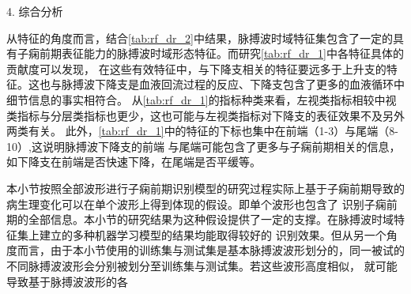 4. 综合分析

从特征的角度而言，结合\autoref{tab:rf_dr_2}中结果，脉搏波时域特征集包含了一定的具有子痫前期表征能力的脉搏波时域形态特征。而研究\autoref{tab:rf_dr_1}中各特征具体的贡献度可以发现，
在这些有效特征中，与下降支相关的特征要远多于上升支的特征。这也与脉搏波下降支是血液回流过程的反应、下降支包含了更多的血液循环中细节信息的事实相符合。
从\autoref{tab:rf_dr_1}的指标种类来看，左视类指标相较中视类指标与分层类指标也更少，这也可能与左视类指标对下降支的表征效果不及另外两类有关。
此外，\autoref{tab:rf_dr_1}中的特征的下标也集中在前端（1-3）与尾端（8-10）,这说明脉搏波下降支的前端
与尾端可能包含了更多与子痫前期相关的信息，如下降支在前端是否快速下降，在尾端是否平缓等。

本小节按照全部波形进行子痫前期识别模型的研究过程实际上基于子痫前期导致的病生理变化可以在单个波形上得到体现的假设。即单个波形也包含了
识别子痫前期的全部信息。本小节的研究结果为这种假设提供了一定的支撑。在脉搏波时域特征集上建立的多种机器学习模型的结果均能取得较好的
识别效果。但从另一个角度而言，由于本小节使用的训练集与测试集是基本脉搏波波形划分的，同一被试的不同脉搏波波形会分别被划分至训练集与测试集。若这些波形高度相似，
就可能导致基于脉搏波波形的各

